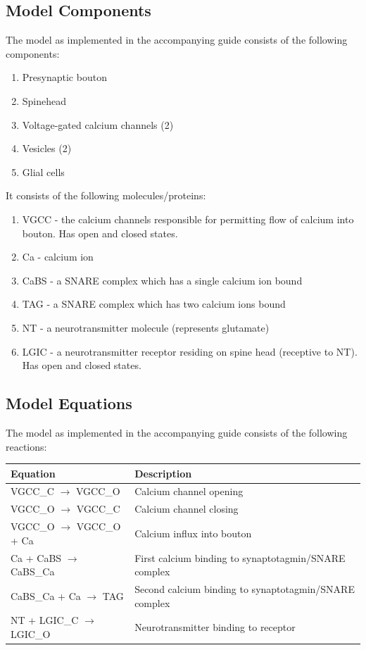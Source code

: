 \documentclass[a4paper]{article}
\begin{document}
\subsection{Model Components}
The model as implemented in the accompanying guide consists of the following components:
\begin{enumerate} 
    \item Presynaptic bouton
    \item Spinehead
    \item Voltage-gated calcium channels (2)
    \item Vesicles (2)
    \item Glial cells
\end{enumerate}

It consists of the following molecules/proteins:
\begin{enumerate}
    \item VGCC - the calcium channels responsible for permitting flow of calcium into bouton. Has open and closed states.
    \item Ca - calcium ion
    \item CaBS - a SNARE complex which has a single calcium ion bound
    \item TAG - a SNARE complex which has two calcium ions bound
    \item NT - a neurotransmitter molecule (represents glutamate)
    \item LGIC - a neurotransmitter receptor residing on spine head (receptive to NT). Has open and closed states.
\end{enumerate}

\subsection{Model Equations}
The model as implemented in the accompanying guide consists of the following reactions:
\begin{table}[H]
\begin{tabular}{ll}
Equation & Description \\ \hline
VGCC\_C $\to$ VGCC\_O & Calcium channel opening \\
VGCC\_O $\to$ VGCC\_C & Calcium channel closing \\
VGCC\_O $\to$ VGCC\_O + Ca & Calcium influx into bouton \\
Ca + CaBS $\to$ CaBS\_Ca & First calcium binding to synaptotagmin/SNARE complex  \\ 
CaBS\_Ca + Ca $\to$ TAG & Second calcium binding to synaptotagmin/SNARE complex  \\
NT + LGIC\_C $\to$ LGIC\_O& Neurotransmitter binding to receptor \\
\end{tabular} 
\end{table}
\end{document}
